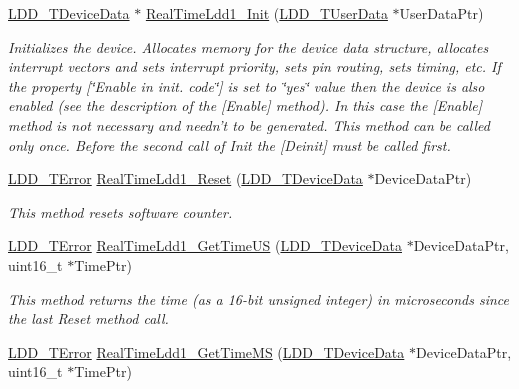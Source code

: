 \begin{DoxyCompactItemize}
\item 
\hyperlink{group___p_e___types__module_gac5cf1362f1f0e3a2ce71b1bf2276d091}{L\-D\-D\-\_\-\-T\-Device\-Data} $\ast$ \hyperlink{group___real_time_ldd1__module_ga1770d420ac232c72051865675436d517}{Real\-Time\-Ldd1\-\_\-\-Init} (\hyperlink{group___p_e___types__module_ga0b66a73f87238a782318aa0be7578e35}{L\-D\-D\-\_\-\-T\-User\-Data} $\ast$User\-Data\-Ptr)
\begin{DoxyCompactList}\small\item\em Initializes the device. Allocates memory for the device data structure, allocates interrupt vectors and sets interrupt priority, sets pin routing, sets timing, etc. If the property \mbox{[}\char`\"{}\-Enable in init. code\char`\"{}\mbox{]} is set to \char`\"{}yes\char`\"{} value then the device is also enabled (see the description of the \mbox{[}Enable\mbox{]} method). In this case the \mbox{[}Enable\mbox{]} method is not necessary and needn't to be generated. This method can be called only once. Before the second call of Init the \mbox{[}Deinit\mbox{]} must be called first. \end{DoxyCompactList}\item 
\hyperlink{group___p_e___types__module_ga24c2b045fd04e79e85f261ce4df35588}{L\-D\-D\-\_\-\-T\-Error} \hyperlink{group___real_time_ldd1__module_ga0ab12085af54faedfa91a478fa2503fb}{Real\-Time\-Ldd1\-\_\-\-Reset} (\hyperlink{group___p_e___types__module_gac5cf1362f1f0e3a2ce71b1bf2276d091}{L\-D\-D\-\_\-\-T\-Device\-Data} $\ast$Device\-Data\-Ptr)
\begin{DoxyCompactList}\small\item\em This method resets software counter. \end{DoxyCompactList}\item 
\hyperlink{group___p_e___types__module_ga24c2b045fd04e79e85f261ce4df35588}{L\-D\-D\-\_\-\-T\-Error} \hyperlink{group___real_time_ldd1__module_ga39a45f1663f1d6d416b5d81f845af8b9}{Real\-Time\-Ldd1\-\_\-\-Get\-Time\-U\-S} (\hyperlink{group___p_e___types__module_gac5cf1362f1f0e3a2ce71b1bf2276d091}{L\-D\-D\-\_\-\-T\-Device\-Data} $\ast$Device\-Data\-Ptr, uint16\-\_\-t $\ast$Time\-Ptr)
\begin{DoxyCompactList}\small\item\em This method returns the time (as a 16-\/bit unsigned integer) in microseconds since the last Reset method call. \end{DoxyCompactList}\item 
\hyperlink{group___p_e___types__module_ga24c2b045fd04e79e85f261ce4df35588}{L\-D\-D\-\_\-\-T\-Error} \hyperlink{group___real_time_ldd1__module_ga1b5875d7a8eea98aff85f9b009d1b8a2}{Real\-Time\-Ldd1\-\_\-\-Get\-Time\-M\-S} (\hyperlink{group___p_e___types__module_gac5cf1362f1f0e3a2ce71b1bf2276d091}{L\-D\-D\-\_\-\-T\-Device\-Data} $\ast$Device\-Data\-Ptr, uint16\-\_\-t $\ast$Time\-Ptr)

\end{DoxyCompactItemize}

